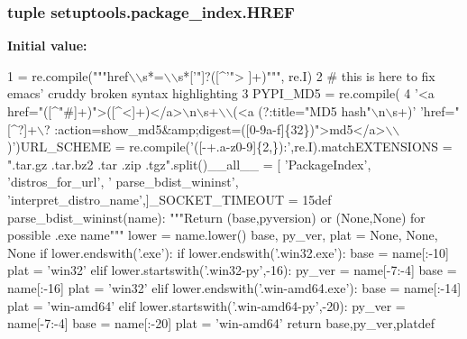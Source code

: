 \subsubsection[{H\+R\+E\+F}]{\setlength{\rightskip}{0pt plus 5cm}tuple setuptools.\+package\+\_\+index.\+H\+R\+E\+F}\label{namespacesetuptools_1_1package__index_a225aa76e4bbf555ddb21de9273d51867}
{\bfseries Initial value\+:}
\begin{DoxyCode}
1 = re.compile(\textcolor{stringliteral}{"""href\(\backslash\)\(\backslash\)s*=\(\backslash\)\(\backslash\)s*['"]?([^'"> ]+)"""}, re.I)
2 \textcolor{comment}{# this is here to fix emacs' cruddy broken syntax highlighting}
3 PYPI\_MD5 = re.compile(
4     \textcolor{stringliteral}{'<a href="([^"#]+)">([^<]+)</a>\(\backslash\)n\(\backslash\)s+\(\backslash\)\(\backslash\)(<a (?:title="MD5 hash"\(\backslash\)n\(\backslash\)s+)'}    \textcolor{stringliteral}{'href="[^?]+\(\backslash\)?
      :action=show\_md5&amp;digest=([0-9a-f]\{32\})">md5</a>\(\backslash\)\(\backslash\))'})URL\_SCHEME = re.compile(\textcolor{stringliteral}{'([-+.a-z0-9]\{2,\}):'},re.I).matchEXTENSIONS = \textcolor{stringliteral}{
      ".tar.gz .tar.bz2 .tar .zip .tgz"}.split()\_\_all\_\_ = [    \textcolor{stringliteral}{'PackageIndex'}, \textcolor{stringliteral}{'distros\_for\_url'}, \textcolor{stringliteral}{'
      parse\_bdist\_wininst'},    \textcolor{stringliteral}{'interpret\_distro\_name'},]\_SOCKET\_TIMEOUT = 15\textcolor{keyword}{def }parse\_bdist\_wininst(name):    \textcolor{stringliteral}{"""Return
       (base,pyversion) or (None,None) for possible .exe name"""}    lower = name.lower()    base, py\_ver, plat = \textcolor{keywordtype}{None}, \textcolor{keywordtype}{None}, \textcolor{keywordtype}{
      None}    \textcolor{keywordflow}{if} lower.endswith(\textcolor{stringliteral}{'.exe'}):        \textcolor{keywordflow}{if} lower.endswith(\textcolor{stringliteral}{'.win32.exe'}):            base = name[:-10]     
             plat = \textcolor{stringliteral}{'win32'}        \textcolor{keywordflow}{elif} lower.startswith(\textcolor{stringliteral}{'.win32-py'},-16):            py\_ver = name[-7:-4]        
          base = name[:-16]            plat = \textcolor{stringliteral}{'win32'}        \textcolor{keywordflow}{elif} lower.endswith(\textcolor{stringliteral}{'.win-amd64.exe'}):            
      base = name[:-14]            plat = \textcolor{stringliteral}{'win-amd64'}        \textcolor{keywordflow}{elif} lower.startswith(\textcolor{stringliteral}{'.win-amd64-py'},-20):            
      py\_ver = name[-7:-4]            base = name[:-20]            plat = \textcolor{stringliteral}{'win-amd64'}    \textcolor{keywordflow}{return} base,py\_ver,platdef

\end{DoxyCode}
